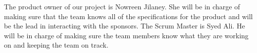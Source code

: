 The product owner of our project is Nowreen Jilaney. She will be in charge of making sure that the team knows all of the specifications for the product and will be the lead in interacting with the sponsors.
The Scrum Master is Syed Ali.
He will be in charge of making sure the team members know what they are working on and keeping the team on track.
